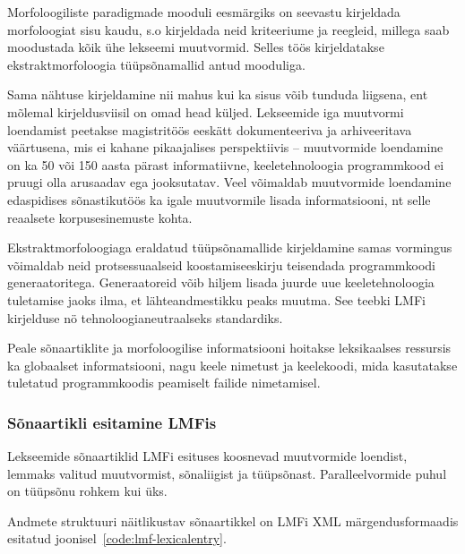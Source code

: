 \documentclass[12pt,a4paper]{article}
\begin{document}
Morfoloogiliste paradigmade mooduli eesmärgiks on seevastu kirjeldada morfoloogiat sisu kaudu, s.o kirjeldada neid kriteeriume ja reegleid, millega saab moodustada kõik ühe lekseemi muutvormid. Selles töös kirjeldatakse ekstrakt\-morfoloogia tüüpsõna\-mallid antud mooduliga.

Sama nähtuse kirjeldamine nii mahus kui ka sisus võib tunduda liigsena, ent mõlemal kirjeldusviisil on omad head küljed. Lekseemide iga muutvormi loendamist peetakse magistritöös eeskätt dokumenteeriva ja arhiveeritava väärtusena, mis ei kahane pikaajalises perspektiivis -- muutvormide loendamine on ka 50 või 150 aasta pärast informatiivne, keele\-tehnoloogia programm\-kood ei pruugi olla arusaadav ega jooksutatav. Veel võimaldab muutvormide loendamine edaspidises sõnastikutöös ka igale muutvormile lisada informatsiooni, nt selle reaalsete korpusesinemuste kohta. %

Ekstraktmorfoloogiaga eraldatud tüüpsõnamallide kirjeldamine samas vormingus võimaldab neid protsessuaalseid koostamis\-eeskirju teisendada programm\-koodi generaatoritega. Generaatoreid võib hiljem lisada juurde uue keeletehnoloogia tuletamise jaoks ilma, et lähte\-andmestikku peaks muutma. See teebki LMFi kirjelduse nö tehnoloogia\-neutraalseks standardiks.

Peale sõnaartiklite ja morfoloogilise informatsiooni hoitakse leksikaalses ressursis ka globaalset informatsiooni, nagu keele nimetust ja keele\-koodi, mida kasutatakse tuletatud programmkoodis peamiselt failide nimetamisel.



\subsubsection{Sõnaartikli esitamine LMFis}
Lekseemide sõnaartiklid LMFi esituses koosnevad muutvormide loendist, lemmaks valitud muutvormist, sõnaliigist ja tüüpsõnast. Paralleelvormide puhul on tüüpsõnu rohkem kui üks.

Andmete struktuuri näitlikustav sõnaartikkel on LMFi XML märgendus\-formaadis esitatud joonisel~\ref{code:lmf-lexicalentry}.
\end{document}
